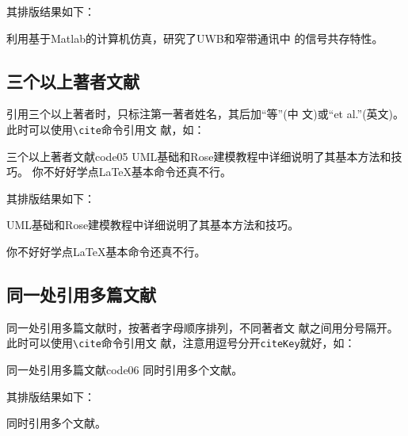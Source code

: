 \documentclass{ctexbook}
\newcommand\cs[1]{\texttt{\textbackslash#1}}
\begin{document}
其排版结果如下：

\begin{center}
  \begin{boxedminipage}{0.9\textwidth}
    \small
    利用基于Matlab的计算机仿真\cite{郭文彬2006--}，研究了UWB和窄带通讯中
      的信号共存特性\cite{Chiani2009-231-254}。%
  \end{boxedminipage}
\end{center}


\subsection{三个以上著者文献}

引用三个以上著者时，只标注第一著者姓名，其后加\enquote{等}(中
文)或\enquote{et al.}(英文)。此时可以使用\cs{cite}命令引用文
献，如：

\begin{codetex}{三个以上著者文献}{code05}
  UML基础和Rose建模教程中详细说明了其基本方法和技巧\cite{蔡敏2006--}。
  你不好好学点\LaTeX{}基本命令还真不行\cite{r9}。%
\end{codetex}

其排版结果如下：

\begin{center}
  \begin{boxedminipage}{0.9\textwidth}
    \small
    UML基础和Rose建模教程中详细说明了其基本方法和技巧\cite{蔡敏2006--}。

    你不好好学点\LaTeX{}基本命令还真不行\cite{r9}。%
  \end{boxedminipage}
\end{center}

\subsection{同一处引用多篇文献}

同一处引用多篇文献时，按著者字母顺序排列，不同著者文
献之间用分号隔开。此时可以使用\cs{cite}命令引用文
献，注意用逗号分开\texttt{citeKey}就好，如：

\begin{codetex}{同一处引用多篇文献}{code06}
  同时引用多个文献\cite{r2,r3,r4,r6}。%
\end{codetex}

其排版结果如下：

\begin{center}
  \begin{boxedminipage}{0.9\textwidth}
    \small
    同时引用多个文献\cite{r2,r3,r4,r6}。%
  \end{boxedminipage}
\end{center}
\end{document}
